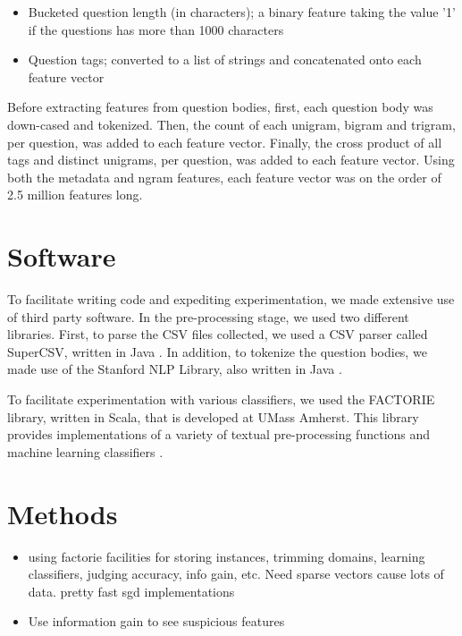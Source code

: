 \documentclass[11pt]{article}
\begin{document}
\begin{itemize}
  \item Bucketed question length (in characters); a binary feature
    taking the value '1' if the questions has more than 1000 characters
  \item Question tags; converted to a list of strings and concatenated
    onto each feature vector
\end{itemize}

Before extracting features from question bodies, first, each question
body was down-cased and tokenized. Then, the count of each unigram, bigram and
trigram, per question, was added to each feature vector. Finally, the
cross product of all tags and distinct unigrams, per question, was
added to each feature vector.  Using both the metadata and ngram
features, each feature vector was on the order of 2.5 million features
long.

\section{Software}

To facilitate writing code and expediting experimentation, we made
extensive use of third party software. In the pre-processing stage, we
used two different libraries.  First, to parse the CSV files
collected, we used a CSV parser called SuperCSV, written in Java
\cite{website:supercsv}. In addition, to tokenize the question bodies,
we made use of the Stanford NLP Library, also written in Java
\cite{stanfordnlp}.

To facilitate experimentation with various classifiers, we used the
FACTORIE library, written in Scala, that is developed at UMass
Amherst.  This library provides implementations of a variety of
textual pre-processing functions and machine learning classifiers
\cite{mccallum09:factorie:}.

\section{Methods}
\begin{itemize}
\item using factorie facilities for storing instances, trimming domains, learning classifiers, judging accuracy, info gain, etc. Need sparse vectors cause lots of data. pretty fast sgd implementations
\item Use information gain to see suspicious features
\end{itemize}
\end{document}
